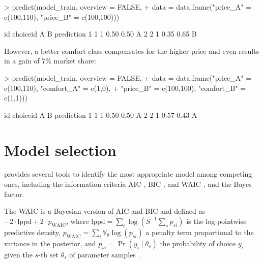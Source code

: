 \documentclass[article,shortnames]{jss}
\begin{document}
\begin{Schunk}
\begin{Sinput}
> predict(model_train, overview = FALSE,
+          data = data.frame("price_A" = c(100,110), "price_B" = c(100,100)))
\end{Sinput}
\begin{Soutput}
  id choiceid    A    B prediction
1  1        1 0.50 0.50          A
2  2        1 0.35 0.65          B
\end{Soutput}
\end{Schunk}

However, a better comfort class compensates for the higher price and even results in a gain of 7\% market share:

\begin{Schunk}
\begin{Sinput}
> predict(model_train, overview = FALSE,
+          data = data.frame("price_A" = c(100,110), "comfort_A" = c(1,0),
+                            "price_B" = c(100,100), "comfort_B" = c(1,1)))
\end{Sinput}
\begin{Soutput}
  id choiceid    A    B prediction
1  1        1 0.50 0.50          A
2  2        1 0.57 0.43          A
\end{Soutput}
\end{Schunk}

\section{Model selection} \label{sec:model_selection}

 provides several tools to identify the most appropriate model among competing ones, including the information criteria AIC \citep{Akaike:1974}, BIC \citep{Schwarz:1978}, and WAIC \citep{Watanabe:2010}, and the Bayes factor.

The WAIC is a Bayesian version of AIC and BIC and defined as $-2 \cdot \text{lppd} + 2\cdot p_\text{WAIC}$, where $\text{lppd} = \sum_i \log \left( S^{-1} \sum_s p_{si} \right)$ is the log-pointwise predictive density, $p_\text{WAIC} = \sum_i \mathbb{V}_{\theta} \log (p_{si})$ a penalty term proportional to the variance in the posterior, and $p_{si} = \Pr(y_i\mid \theta_s)$ the probability of choice $y_i$ given the $s$-th set $\theta_s$ of parameter samples \citep[p.\ 220]{McElreath:2016}.
\end{document}
